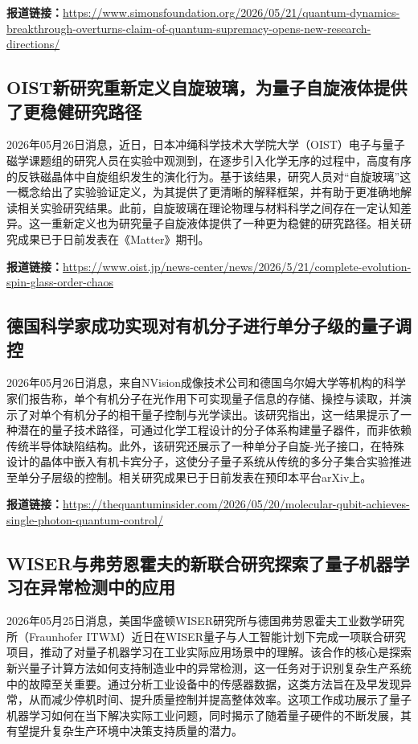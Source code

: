 \documentclass[12pt,a4paper]{ctexart}
\begin{document}
\noindent\textbf{报道链接：}\url{https://www.simonsfoundation.org/2026/05/21/quantum-dynamics-breakthrough-overturns-claim-of-quantum-supremacy-opens-new-research-directions/}

\subsection{ OIST新研究重新定义自旋玻璃，为量子自旋液体提供了更稳健研究路径 }

2026年05月26日消息，近日，日本冲绳科学技术大学院大学（OIST）电子与量子磁学课题组的研究人员在实验中观测到，在逐步引入化学无序的过程中，高度有序的反铁磁晶体中自旋组织发生的演化行为。基于该结果，研究人员对“自旋玻璃”这一概念给出了实验验证定义，为其提供了更清晰的解释框架，并有助于更准确地解读相关实验研究结果。此前，自旋玻璃在理论物理与材料科学之间存在一定认知差异。这一重新定义也为研究量子自旋液体提供了一种更为稳健的研究路径。相关研究成果已于日前发表在《Matter》期刊。

\noindent\textbf{报道链接：}\url{https://www.oist.jp/news-center/news/2026/5/21/complete-evolution-spin-glass-order-chaos}

\subsection{ 德国科学家成功实现对有机分子进行单分子级的量子调控 }

2026年05月26日消息，来自NVision成像技术公司和德国乌尔姆大学等机构的科学家们报告称，单个有机分子在光作用下可实现量子信息的存储、操控与读取，并演示了对单个有机分子的相干量子控制与光学读出。该研究指出，这一结果提示了一种潜在的量子技术路径，可通过化学工程设计的分子体系构建量子器件，而非依赖传统半导体缺陷结构。此外，该研究还展示了一种单分子自旋-光子接口，在特殊设计的晶体中嵌入有机卡宾分子，这使分子量子系统从传统的多分子集合实验推进至单分子层级的控制。相关研究成果已于日前发表在预印本平台arXiv上。

\noindent\textbf{报道链接：}\url{https://thequantuminsider.com/2026/05/20/molecular-qubit-achieves-single-photon-quantum-control/}

\subsection{ WISER与弗劳恩霍夫的新联合研究探索了量子机器学习在异常检测中的应用 }

2026年05月25日消息，美国华盛顿WISER研究所与德国弗劳恩霍夫工业数学研究所（Fraunhofer ITWM）近日在WISER量子与人工智能计划下完成一项联合研究项目，推动了对量子机器学习在工业实际应用场景中的理解。该合作的核心是探索新兴量子计算方法如何支持制造业中的异常检测，这一任务对于识别复杂生产系统中的故障至关重要。通过分析工业设备中的传感器数据，这类方法旨在及早发现异常，从而减少停机时间、提升质量控制并提高整体效率。这项工作成功展示了量子机器学习如何在当下解决实际工业问题，同时揭示了随着量子硬件的不断发展，其有望提升复杂生产环境中决策支持质量的潜力。
\end{document}
